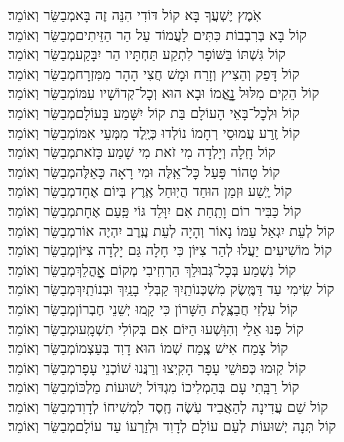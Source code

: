 \documentclass[twoside, openany, parskip=half, 11pt]{book}
\begin{document}
\begin{small}
	אֹֽמֶץ יֶשְׁעֲךָ בָּא קוֹל דּוֹדִי הִנֵּה זֶה בָּא\hfill מְבַשֵּׂר וְאוֹמֵר׃\\
	קוֹל בָּא בְּרִבְבוֹת כִּתִּים לַעֲמוֹד עַל הַר הַזֵּיתִים\hfill מְבַשֵּׂר וְאוֹמֵר׃\\
	קוֹל גִּשְׁתּוֹ בַּשּׁוֹפָר לִתְקַע תַּחְתָּיו הַר יִבָּקַע\hfill מְבַשֵּׂר וְאוֹמֵר׃\\
	קוֹל דָּפַק וְהֵצִיץ וְזָרַח וּמָשׁ חֲצִי הָהָר מִמִּזְרָח\hfill מְבַשֵּׂר וְאוֹמֵר׃\\
	קוֹל הֵקִים מִלּוּל נׇׇׇׇאֳמוֹ וּבָא הוּא וְכׇל־קְדוֹשָׁיו עִמּוֹ\hfill מְבַשֵּׂר וְאוֹמֵר׃\\
	קוֹל וּלְכׇל־בָּאֵי הָעוֹלָם בַּת קוֹל יִשָּׁמַע בָּעוֹלָם\hfill מְבַשֵּׂר וְאוֹמֵר׃\\
	קוֹל זֶֽרַע עֲמוּסֵי רְחָמוֹ נוֹלְדוּ כְּיֶֽלֶד מִמְּעֵי אִמּוֹ\hfill מְבַשֵּׂר וְאוֹמֵר׃\\
	קוֹל חָֽלָה וְיָלְדָה מִי זֹאת מִי שָׁמַע כָּזֹאת\hfill מְבַשֵּׂר וְאוֹמֵר׃\\
	קוֹל טָהוֹר פָּעַל כׇּל־אֵֽלֶּה וּמִי רָאָה כָּאֵלֶּה\hfill מְבַשֵּׂר וְאוֹמֵר׃\\
	קוֹל יֶֽשַׁע וּזְמַן הוּחַד הֲיֽוּחַל אֶֽרֶץ בְּיוֹם אֶחָד\hfill מְבַשֵּׂר וְאוֹמֵר׃\\
	קוֹל כַּבִּיר רוֹם וָתַֽחַת אִם יִוָּלֵד גּוֹי פַּֽעַם אֶחָת\hfill מְבַשֵּׂר וְאוֹמֵר׃\\
	קוֹל לְעֵת יִגְאַל עַמּוֹ נָאוֹר וְהָיָה לְעֵת עֶֽרֶב יִהְיֶה אוֹר\hfill מְבַשֵּׂר וְאוֹמֵר׃\\
	קוֹל מוֹשִׁיעִים יַעֲלוּ לְהַר צִיּוֹן כִּי חָלָה גַּם יָלְדָה צִיּוֹן\hfill מְבַשֵּׂר וְאוֹמֵר׃\\
	קוֹל נִשְׁמַע בְּכׇל־גְּבוּלֵךְ הַרְחִֽיבִי מְקוֹם אׇׇׇׇׇׇהֳלֵךְ\hfill מְבַשֵּׂר וְאוֹמֵר׃\\
	קוֹל שִֽׂימִי עַד דַּמֶּֽשֶׂק מִשְׁכְּנוֹתַֽיִךְ קַבְּלִי בָנַֽיִךְ וּבְנוֹתַֽיִךְ\hfill מְבַשֵּׂר וְאוֹמֵר׃\\
	קוֹל עִלְזִי חֲבַצֶּֽלֶת הַשָּׁרוֹן כִּי קָֽמוּ יְשֵׁנֵי חֶבְרוֹן\hfill מְבַשֵּׂר וְאוֹמֵר׃\\
	קוֹל פְּנוּ אֵלַי וְהִוָּשְׁעוּ הַיּוֹם אִם בְּקוֹלִי תִשְׁמָֽעוּ\hfill מְבַשֵּׂר וְאוֹמֵר׃\\
	קוֹל צָמַח אִישׁ צֶֽמַח שְׁמוֹ הוּא דָוִד בְּעַצְמוֹ\hfill מְבַשֵּׂר וְאוֹמֵר׃\\
	קוֹל קֽוּמוּ כְּפוּשֵׁי עָפָר הָקִֽיצוּ וְרַנֲּנוּ שׁוֹכְנֵי עָפָר\hfill מְבַשֵּׂר וְאוֹמֵר׃\\
	קוֹל רַבָּֽתִי עָם בְּהַמְלִיכוֹ מִגְדּוֹל יְשׁוּעוֹת מַלְכּוֹ\hfill מְבַשֵּׂר וְאוֹמֵר׃\\
	קוֹל שֵׁם עֲדִינָה לְהַאֲבִיד עֹֽשֶׂה חֶֽסֶד לִמְשִׁיחוֹ לְדָוִד\hfill מְבַשֵּׂר וְאוֹמֵר׃\\
	קוֹל תְּנָה יְשׁוּעוֹת לְעַם עוֹלָם לְדָוִד וּלְזַרְעוֹ עַד עוֹלָם\hfill מְבַשֵּׂר וְאוֹמֵר׃\\
	
\end{small}
\end{document}
